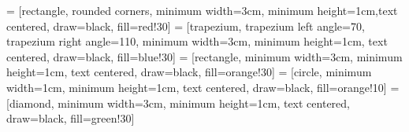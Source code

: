 \DeclareSIUnit{}

 = [rectangle, rounded corners, minimum width=3cm, minimum height=1cm,text centered, draw=black, fill=red!30]
 = [trapezium, trapezium left angle=70, trapezium right angle=110, minimum width=3cm, minimum height=1cm, text centered, draw=black, fill=blue!30]
 = [rectangle, minimum width=3cm, minimum height=1cm, text centered, draw=black, fill=orange!30]
 = [circle, minimum width=1cm, minimum height=1cm, text
centered, draw=black, fill=orange!10]
 = [diamond, minimum width=3cm, minimum height=1cm, text centered, draw=black, fill=green!30]

\usetikzlibrary{shapes.geometric, arrows}
